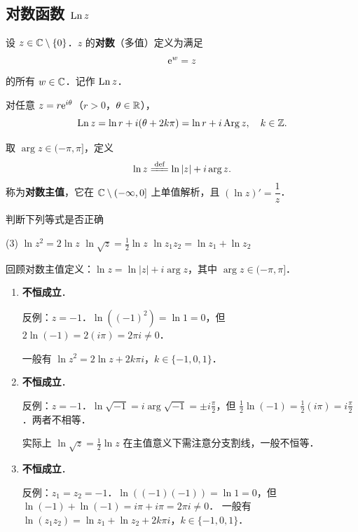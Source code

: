 \documentclass[12pt, a4paper, oneside, UTF8]{ctexbook}
\begin{document}
\subsection{对数函数 $\operatorname{Ln} z$}
\begin{definition}[对数函数（多值）]
设 $z\in\mathbb{C}\setminus\{0\}$．$z$ 的\textbf{对数}（多值）定义为满足
\[
\mathrm{e}^w = z
\]
的所有 $w\in\mathbb{C}$．记作 $\operatorname{Ln} z$．
\end{definition}

\begin{theorem}[对数函数（多值）公式]
对任意 $z = r\mathrm{e}^{i\theta}$（$r>0$，$\theta\in\mathbb{R}$），
\[
\operatorname{Ln} z = \ln r + i(\theta + 2k\pi) = \ln r + i\operatorname{Arg} z,\quad k\in\mathbb{Z}.
\]
\end{theorem}

\begin{definition}[对数主值 $\ln z$]
取 $\arg z\in(-\pi,\pi]$，定义
\[
\ln z \defeq \ln\abs{z} + i\arg z.
\]
称为\textbf{对数主值}，它在 $\mathbb{C}\setminus(-\infty,0]$ 上单值解析，且 $(\ln z)' = \dfrac{1}{z}$．
\end{definition}

\begin{example}
    判断下列等式是否正确
    \begin{tasks}[label-width=1.2em, label=(\arabic*)](3)
        \task $\ln z^2 = 2\ln z$
        \task $\ln \sqrt{z} = \frac{1}{2}\ln z$
        \task $\ln z_1z_2 = \ln z_1 + \ln z_2$
    \end{tasks}
\end{example}
\begin{solution}
    回顾对数主值定义：$\ln z = \ln|z| + i\arg z$，其中 $\arg z \in (-\pi, \pi]$．
    \begin{enumerate}[label=(\arabic*)]
        \item \textbf{不恒成立}．
        
            反例：$z = -1$．$\ln((-1)^2) = \ln 1 = 0$，但 $2\ln(-1) = 2(i\pi) = 2\pi i \neq 0$．
              
            一般有 $\ln z^2 = 2\ln z + 2k\pi i$，$k\in\{-1,0,1\}$．
        \item \textbf{不恒成立}．
        
            反例：$z = -1$．$\ln\sqrt{-1} = i\arg \sqrt{-1} = \pm i\frac{\pi}{2}$，但 $\frac12\ln(-1) = \frac12(i\pi) = i\frac{\pi}{2}$．两者不相等．
              
            实际上 $\ln\sqrt{z} = \frac12\ln z$ 在主值意义下需注意分支割线，一般不恒等．
        \item \textbf{不恒成立}．
        
            反例：$z_1 = z_2 = -1$．$\ln((-1)(-1)) = \ln 1 = 0$，但 $\ln(-1)+\ln(-1) = i\pi + i\pi = 2\pi i \neq 0$．
              一般有 $\ln(z_1z_2) = \ln z_1 + \ln z_2 + 2k\pi i$，$k\in\{-1,0,1\}$．
    \end{enumerate}
\end{solution}
\end{document}
